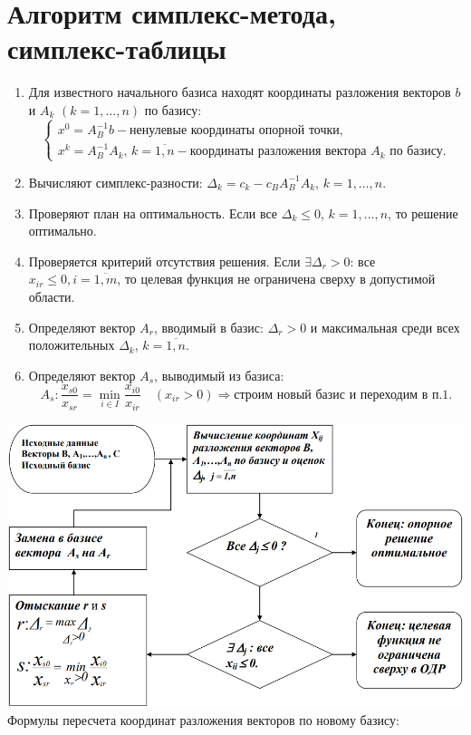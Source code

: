 \documentclass[17pt]{extarticle}
\begin{document}
\section{Алгоритм симплекс-метода, симплекс-таблицы}
\begin{enumerate}
    \item Для известного начального базиса находят координаты разложения векторов \( b \) и \( A_k \) \( (k = 1, \ldots, n) \) по базису:
          \[
              \begin{cases}
                  x^0 = A_B^{-1}b - \text{ненулевые координаты опорной точки}, \\
                  x^k = A_B^{-1}A_k, \, k = \overline{1,n} - \text{координаты разложения вектора } A_k \text{ по базису}.
              \end{cases}
          \]
    \item Вычисляют симплекс-разности: \(\Delta_k = c_k - c_B A_B^{-1}A_k, \, k = 1, \ldots, n. \)
    \item Проверяют план на оптимальность. Если все \(\Delta_k \leq 0\), \( k = 1, \ldots, n \), то решение оптимально.
    \item Проверяется критерий отсутствия решения.
          Если \(\exists \Delta_r > 0\): все \( x_{ir} \leq 0, i = \overline{1,m} \), то целевая функция не ограничена сверху в допустимой области.
    \item Определяют вектор \( A_r \), вводимый в базис: \(\Delta_r > 0\)
          и максимальная среди всех положительных \(\Delta_k\), \( k = \overline{1,n} \).

    \item Определяют вектор \( A_s \), выводимый из базиса:
          \[
              A_s : \frac{x_{s0}}{x_{sr}} = \min_{i \in I} \frac{x_{i0}}{x_{ir}} \quad (x_{ir} > 0) \Rightarrow \text{строим новый базис и переходим в п.1.}
          \]
\end{enumerate}
\includegraphics[width=1\textwidth]{9.png}
Формулы пересчета координат разложения векторов по новому базису:
\end{document}
